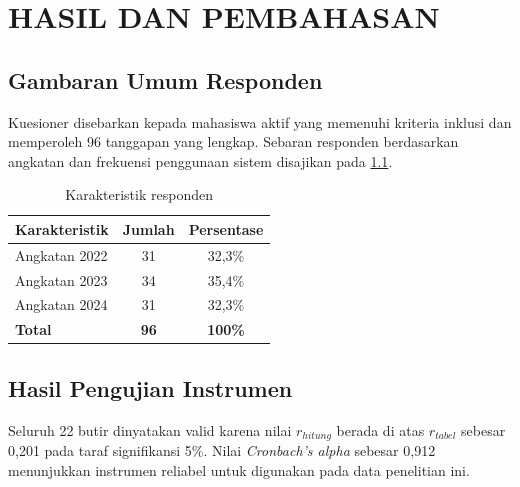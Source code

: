 %

\chapter{HASIL DAN PEMBAHASAN}

\section{Gambaran Umum Responden}
Kuesioner disebarkan kepada mahasiswa aktif yang memenuhi kriteria inklusi dan
memperoleh 96 tanggapan yang lengkap. Sebaran responden berdasarkan angkatan
dan frekuensi penggunaan sistem disajikan pada \cref{tab:responden}.

\begin{table}[H]
    \centering
    \caption{Karakteristik responden}
    \label{tab:responden}
    \begin{tabular}{|l|c|c|}
        \hline
        \textbf{Karakteristik} & \textbf{Jumlah} & \textbf{Persentase} \\ \hline
        Angkatan 2022 & 31 & 32,3\% \\ \hline
        Angkatan 2023 & 34 & 35,4\% \\ \hline
        Angkatan 2024 & 31 & 32,3\% \\ \hline
        \textbf{Total} & \textbf{96} & \textbf{100\%} \\ \hline
    \end{tabular}
\end{table}

\section{Hasil Pengujian Instrumen}
Seluruh 22 butir dinyatakan valid karena nilai $r_{hitung}$ berada di atas
$r_{tabel}$ sebesar 0,201 pada taraf signifikansi 5\%. Nilai
\textit{Cronbach's alpha} sebesar 0,912 menunjukkan instrumen reliabel untuk
digunakan pada data penelitian ini.


